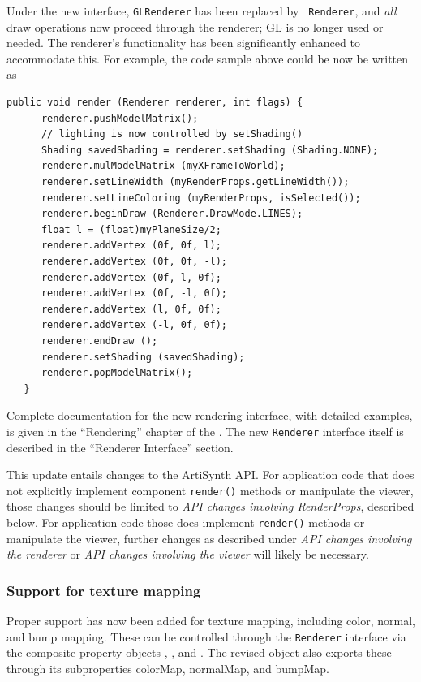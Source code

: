 \documentclass{article}
\begin{document}
Under the new interface, {\tt GLRenderer} has been replaced by {\tt
Renderer}, and {\it all} draw operations now proceed through the
renderer; GL is no longer used or needed. The renderer's 
functionality has been significantly enhanced to accommodate this.
For example, the code sample above could
be now be written as
%
\begin{lstlisting}[]
   public void render (Renderer renderer, int flags) {
      renderer.pushModelMatrix();
      // lighting is now controlled by setShading()
      Shading savedShading = renderer.setShading (Shading.NONE);
      renderer.mulModelMatrix (myXFrameToWorld);
      renderer.setLineWidth (myRenderProps.getLineWidth());
      renderer.setLineColoring (myRenderProps, isSelected());
      renderer.beginDraw (Renderer.DrawMode.LINES);
      float l = (float)myPlaneSize/2;
      renderer.addVertex (0f, 0f, l);
      renderer.addVertex (0f, 0f, -l);
      renderer.addVertex (0f, l, 0f);
      renderer.addVertex (0f, -l, 0f);
      renderer.addVertex (l, 0f, 0f);
      renderer.addVertex (-l, 0f, 0f);
      renderer.endDraw ();
      renderer.setShading (savedShading);
      renderer.popModelMatrix();
   }
\end{lstlisting}
%

Complete documentation for the new rendering interface, with detailed
examples, is given in the ``Rendering'' chapter of the
. 
The new {\tt Renderer} interface itself is
described in the ``Renderer Interface'' section.

This update entails changes to the ArtiSynth API. For application code
that does not explicitly implement component {\tt render()} methods or
manipulate the viewer, those changes should be limited to {\it API
changes involving RenderProps}, described below.  For application code
those does implement {\tt render()} methods or manipulate the viewer,
further changes as described under {\it API changes involving the
renderer} or {\it API changes involving the viewer} will likely be
necessary.

\subsubsection*{Support for texture mapping}

Proper support has now been added for texture mapping, including
color, normal, and bump mapping. These can be controlled through the
{\tt Renderer} interface via the composite property objects
,
, and
.  The revised
 object also exports these
through its subproperties {\sf colorMap}, {\sf normalMap}, and {\sf bumpMap}.
\end{document}
